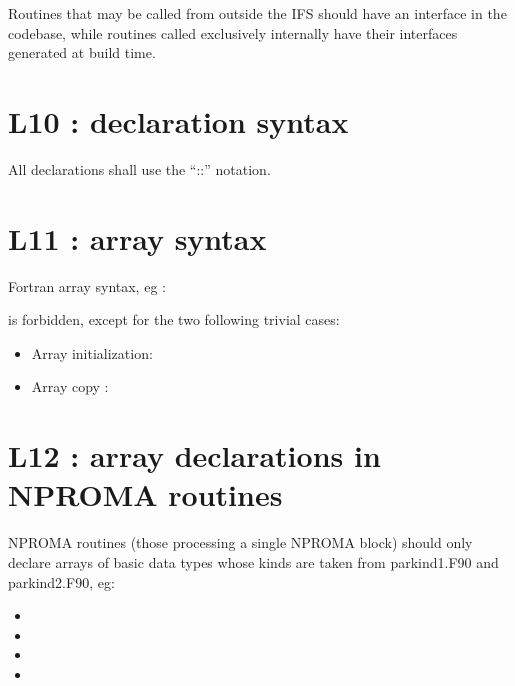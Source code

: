 \documentclass[letterpaper,10pt,english]{sphinxmanual}
\begin{document}
Routines that may be called from outside the IFS should have an interface in the codebase, while
routines called exclusively internally have their interfaces generated at build time.


\section{L10 : declaration syntax}
\label{\detokenize{rules/L10:l10-declaration-syntax}}\label{\detokenize{rules/L10::doc}}
All declarations shall use the “::” notation.


\section{L11 : array syntax}
\label{\detokenize{rules/L11:l11-array-syntax}}\label{\detokenize{rules/L11::doc}}
Fortran array syntax, eg :


is forbidden, except for the two following trivial cases:
\begin{itemize}
\item {} 
Array initialization: 

\item {} 
Array copy : 

\end{itemize}


\section{L12 : array declarations in NPROMA routines}
\label{\detokenize{rules/L12:l12-array-declarations-in-nproma-routines}}\label{\detokenize{rules/L12::doc}}
NPROMA routines (those processing a single NPROMA block) should only declare arrays of basic
data types whose kinds are taken from parkind1.F90 and parkind2.F90, eg:
\begin{itemize}
\item {} 

\item {} 

\item {} 

\item {} 

\end{itemize}
\end{document}

